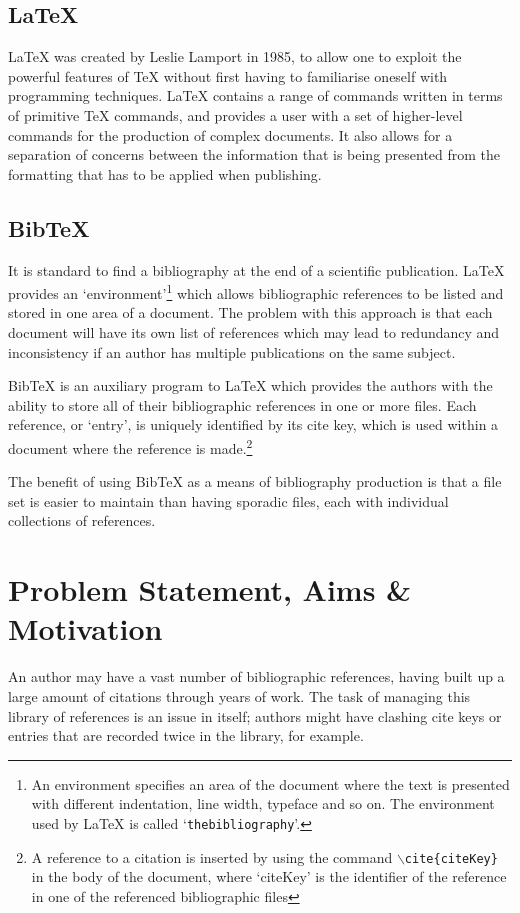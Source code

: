 \documentclass{l4proj}
\newcommand{\BibTeX}{B{\sc ib}\TeX}
\newcommand{\bibtex}{\BibTeX}
\newcommand{\latex}{\LaTeX{} }
\begin{document}
\subsection{\LaTeX}
\latex was created by Leslie Lamport in 1985, to allow one to exploit the powerful features of \TeX{} without first having to familiarise oneself with programming techniques. \latex contains a range of commands written in terms of primitive \TeX{} commands, and provides a user with a set of higher-level commands for the production of complex documents.  It also allows for a separation of concerns between the information that is being presented from the formatting that has to be applied when publishing\cite{KD95}.

\subsection{\bibtex}
It is standard to find a bibliography at the end of a scientific publication. \latex provides an `environment'\footnote{An environment specifies an area of the document where the text is presented with different indentation, line width, typeface and so on\cite{KD95}.  The environment used by \latex is called `\texttt{thebibliography}'.} which allows bibliographic references to be listed and stored in one area of a document\cite{KD95}.  The problem with this approach is that each document will have its own list of references which may lead to redundancy and inconsistency if an author has multiple publications on the same subject. 

\bibtex{} is an auxiliary program to \latex which provides the authors with the ability to store all of their bibliographic references in one or more files.  Each reference, or `entry', is uniquely identified by its cite key, which is used within a document where the reference is made.\footnote{A reference to a citation is inserted by using the command \texttt{$\backslash$cite\{citeKey\}} in the body of the document, where `citeKey' is the identifier of the reference in one of the referenced bibliographic files}

The benefit of using \bibtex{} as a means of bibliography production is that a file set is easier to maintain than having sporadic files, each with individual collections of references.

\section{Problem Statement, Aims \& Motivation}
An author may have a vast number of bibliographic references, having built up a large amount of citations through years of work.  The task of managing this library of references is an issue in itself; authors might have clashing cite keys or entries that are recorded twice in the library, for example.
\end{document}
